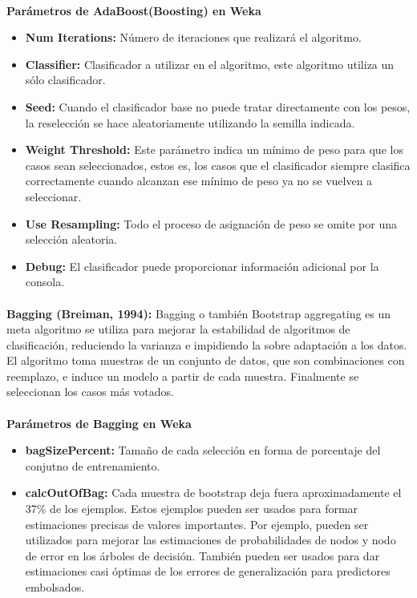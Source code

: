 \documentclass[es]{ifirak}
\begin{document}
\paragraph{}
\textbf{Parámetros de AdaBoost(Boosting) en Weka}
\begin{itemize}
\item\textbf{Num Iterations:} Número de iteraciones que realizará el algoritmo.
\item\textbf{Classifier:} Clasificador a utilizar en el algoritmo, este algoritmo utiliza un sólo clasificador.
\item\textbf{Seed:} Cuando el clasificador base no puede tratar directamente con los pesos, la reselección se hace aleatoriamente utilizando la semilla indicada.
\item\textbf{Weight Threshold:} Este parámetro indica un mínimo de peso para que los casos sean seleccionados, estos es, los casos que el clasificador siempre clasifica correctamente cuando alcanzan ese mínimo de peso ya no se vuelven a seleccionar.
\item\textbf{Use Resampling:} Todo el proceso de asignación de peso se omite por una selección 
aleatoria.
\item\textbf{Debug:} El clasificador puede proporcionar información adicional por la consola.
\end{itemize}
\paragraph{}
\textbf{Bagging (Breiman, 1994):} Bagging o también Bootstrap aggregating es un meta algoritmo se utiliza para mejorar la estabilidad de algoritmos de clasificación, reduciendo la varianza e impidiendo la sobre adaptación a los datos. El algoritmo toma muestras de un conjunto de datos, que son combinaciones con reemplazo, e induce un modelo a partir de cada muestra. Finalmente se seleccionan los casos más votados.
\paragraph{}
\textbf{Parámetros de Bagging en Weka}
\begin{itemize}
\item\textbf{bagSizePercent:} Tamaño de cada selección en forma de porcentaje del conjutno de entrenamiento.
\item\textbf{calcOutOfBag:} Cada muestra de bootstrap deja fuera aproximadamente el 37\% de los ejemplos. Estos ejemplos pueden ser usados para formar estimaciones precisas de valores importantes. Por ejemplo, pueden ser utilizados para mejorar las estimaciones de probabilidades de nodos y nodo de error en los árboles de decisión. También pueden ser usados para dar estimaciones casi óptimas de los errores de generalización para predictores embolsados.
\end{itemize}
\end{document}
